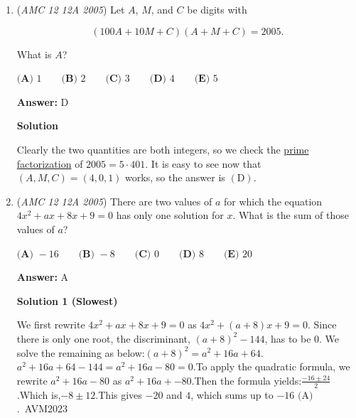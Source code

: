 \begin{enumerate}
 Notice the \href{https://artofproblemsolving.com/wiki/index.php?title=Right\_triangle}{right triangle} (in blue) with legs $1, x+1$ and \href{https://artofproblemsolving.com/wiki/index.php?title=Hypotenuse}{hypotenuse} $\sqrt{50}$. By the \href{https://artofproblemsolving.com/wiki/index.php?title=Pythagorean\_Theorem}{Pythagorean Theorem}, we have $1^2 + (x+1)^2 = (\sqrt{50})^2 \Longrightarrow (x+1)^2 = 49 \Longrightarrow x = 6$. Thus, $[EFGH] = x^2 = 36\ \mathrm{(C)}$



	\item (\textit{AMC 12 12A 2005}) Let $A$, $M$, and $C$ be digits with


 
 \[(100A+10M+C)(A+M+C) = 2005.\]


 What is $A$?


 $\textbf{(A) } 1 \qquad \textbf{(B) } 2 \qquad \textbf{(C) } 3 \qquad \textbf{(D) } 4 \qquad \textbf{(E) } 5$

 \textbf{Answer: }D



\textbf{Solution}

Clearly the two quantities are both integers, so we check the \href{https://artofproblemsolving.com/wiki/index.php?title=Prime\_factorization}{prime factorization} of $2005 = 5 \cdot 401$. It is easy to see now that $(A,M,C) = (4,0,1)$ works, so the answer is $\mathrm{(D)}$.

 


	\item (\textit{AMC 12 12A 2005}) There are two values of $a$ for which the equation $4x^2 + ax + 8x + 9 = 0$ has only one solution for $x$. What is the sum of those values of $a$?


 $\textbf{(A) } -16 \qquad \textbf{(B) } -8 \qquad \textbf{(C) } 0 \qquad \textbf{(D) } 8 \qquad \textbf{(E) } 20$

 \textbf{Answer: }A



\textbf{Solution 1 (Slowest)}

We first rewrite $4x^2 + ax + 8x + 9 = 0$ as $4x^2 + (a+8)x + 9 = 0$. Since there is only one root, the discriminant, $(a+8)^2-144$, has to be 0. We solve the remaining as below:$(a+8)^2 = a^2+16a+64$.$a^2+16a+64-144=a^2+16a-80=0$.To apply the quadratic formula, we rewrite $a^2+16a-80$ as $a^2+16a+-80$.Then the formula yields:$\frac{-16\pm24}{2}$.Which is,$-8\pm12$.This gives $-20$ and $4$, which sums up to $\boxed{-16\text{ (A)}}$.~AVM2023


\end{enumerate}
